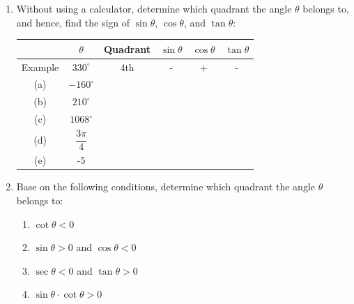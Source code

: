 \documentclass{report}
\begin{document}
\begin{enumerate}
    \item Without using a calculator, determine which quadrant the angle $\theta$ belongs to, and hence, find the sign of $\sin \theta$, $\cos \theta$, and $\tan \theta$:
    
    \begin{center}
        \begin{tabular}{|c|c|c|c|c|c|}
            \cline { 2 - 6 } \multicolumn{1}{c|}{} & $\theta$ & Quadrant & $\sin \theta$ & $\cos \theta$ & $\tan \theta$ \\
            \hline Example & $330^{\circ}$ & 4th & - & + & - \\
            \hline (a) & $-160^{\circ}$ & & & & \\
            \hline (b) & $210^{\circ}$ & & & & \\
            \hline (c) & $1068^{\circ}$ & & & & \\
            \hline (d) & $\dfrac{3 \pi}{4}$ & & & & \\
            \hline (e) & -5 & & & & \\
            \hline
            \end{tabular}
    \end{center}
    \item Base on the following conditions, determine which quadrant the angle $\theta$ belongs to:
    \begin{multicols}{2}
        \begin{enumerate}[label=(\alph*)]
            \item $\cot \theta<0$
            \item $\sin \theta>0$ and $\cos \theta<0$
            \item $\sec \theta<0$ and $\tan \theta>0$
            \item $\sin \theta \cdot \cot \theta>0$
        \end{enumerate}
    \end{multicols}
\end{enumerate}
\end{document}
